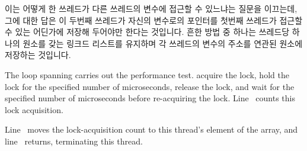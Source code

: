 {{	이는 어떻게 한 쓰레드가 다른 쓰레드의  변수에 접근할 수
	있느냐는 질문을 이끄는데, 그에 대한 답은 이 두번째 쓰레드가 자신의
	 변수로의 포인터를 첫번째 쓰레드가 접근할 수 있는
	어딘가에 저장해 두어야만 한다는 것입니다.
	흔한 방법 중 하나는 쓰레드당 하나의 원소를 갖는 링크드 리스트를
	유지하며 각 쓰레드의  변수의 주소를 연관된 원소에
	저장하는 것입니다.

}\QuickQuizEndE
}

\begin{fcvref}
The loop spanning  carries out the performance test.
 acquire the lock,
 hold the lock for the specified
number of microseconds,
 release the lock,
and  wait for the specified
number of microseconds before re-acquiring the lock.
Line~ counts this lock acquisition.

Line~ moves the lock-acquisition count to this thread's element of the
 array, and line~ returns, terminating this thread.
\end{fcvref}

